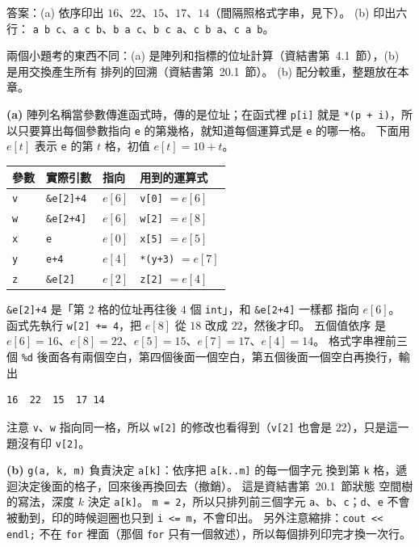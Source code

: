\begin{pastsoln}
答案：(a) 依序印出 $16$、$22$、$15$、$17$、$14$（間隔照格式字串，見下）。 (b) 印出六行：
\texttt{a b c}、\texttt{a c b}、\texttt{b a c}、\texttt{b c a}、\texttt{c b a}、\texttt{c a b}。

兩個小題考的東西不同：(a) 是陣列和指標的位址計算（資結書第~4.1~節），(b) 是用交換產生所有
排列的回溯（資結書第~20.1~節）。 (b) 配分較重，整題放在本章。

\textbf{(a)} 陣列名稱當參數傳進函式時，傳的是位址；在函式裡 \texttt{p[i]} 就是
\texttt{*(p + i)}，所以只要算出每個參數指向 \texttt{e} 的第幾格，就知道每個運算式是
\texttt{e} 的哪一格。 下面用 $e[t]$ 表示 \texttt{e} 的第 $t$ 格，初值 $e[t] = 10 + t$。
\begin{center}
\begin{tabular}{llll}
\toprule
參數 & 實際引數 & 指向 & 用到的運算式 \\
\midrule
\texttt{v} & \texttt{\&e[2]+4} & $e[6]$ & \texttt{v[0]} $= e[6]$ \\
\texttt{w} & \texttt{\&e[2+4]} & $e[6]$ & \texttt{w[2]} $= e[8]$ \\
\texttt{x} & \texttt{e} & $e[0]$ & \texttt{x[5]} $= e[5]$ \\
\texttt{y} & \texttt{e+4} & $e[4]$ & \texttt{*(y+3)} $= e[7]$ \\
\texttt{z} & \texttt{\&e[2]} & $e[2]$ & \texttt{z[2]} $= e[4]$ \\
\bottomrule
\end{tabular}
\end{center}
\texttt{\&e[2]+4} 是「第 $2$ 格的位址再往後 $4$ 個 \texttt{int}」，和 \texttt{\&e[2+4]} 一樣都
指向 $e[6]$。 函式先執行 \texttt{w[2] += 4}，把 $e[8]$ 從 $18$ 改成 $22$，然後才印。 五個值依序
是 $e[6] = 16$、$e[8] = 22$、$e[5] = 15$、$e[7] = 17$、$e[4] = 14$。 格式字串裡前三個
\texttt{\%d} 後面各有兩個空白，第四個後面一個空白，第五個後面一個空白再換行，輸出
\begin{verbatim}
16  22  15  17 14
\end{verbatim}
注意 \texttt{v}、\texttt{w} 指向同一格，所以 \texttt{w[2]} 的修改也看得到（\texttt{v[2]} 也會是
$22$），只是這一題沒有印 \texttt{v[2]}。

\textbf{(b)} \texttt{g(a, k, m)} 負責決定 \texttt{a[k]}：依序把 \texttt{a[k..m]} 的每一個字元
換到第 \texttt{k} 格，遞迴決定後面的格子，回來後再換回去（撤銷）。 這是資結書第~20.1~節狀態
空間樹的寫法，深度 $k$ 決定 \texttt{a[k]}。 \texttt{m = 2}，所以只排列前三個字元
\texttt{a}、\texttt{b}、\texttt{c}；\texttt{d}、\texttt{e} 不會被動到，印的時候迴圈也只到
\texttt{i <= m}，不會印出。 另外注意縮排：\texttt{cout << endl;} 不在 \texttt{for} 裡面（那個
\texttt{for} 只有一個敘述），所以每個排列印完才換一次行。


\end{pastsoln}
